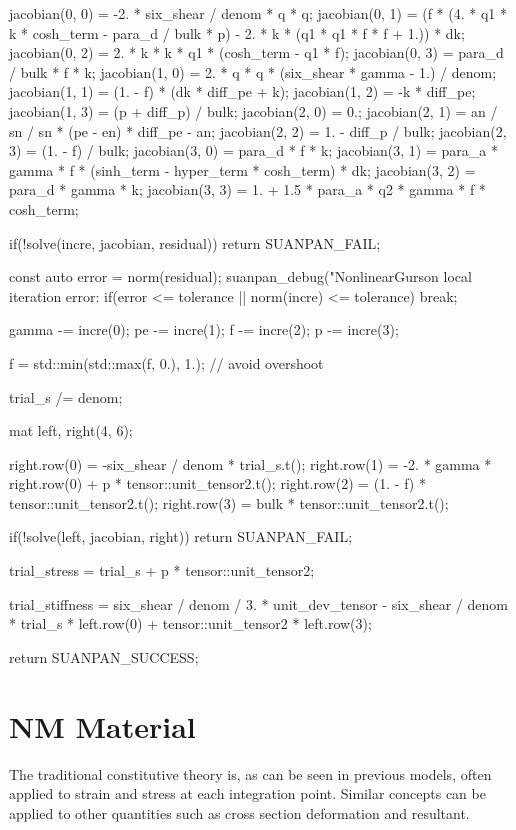 \begin{cppcode}
{{        jacobian(0, 0) = -2. * six_shear / denom * q * q;
        jacobian(0, 1) = (f * (4. * q1 * k * cosh_term - para_d / bulk * p) - 2. * k * (q1 * q1 * f * f + 1.)) * dk;
        jacobian(0, 2) = 2. * k * k * q1 * (cosh_term - q1 * f);
        jacobian(0, 3) = para_d / bulk * f * k;
        jacobian(1, 0) = 2. * q * q * (six_shear * gamma - 1.) / denom;
        jacobian(1, 1) = (1. - f) * (dk * diff_pe + k);
        jacobian(1, 2) = -k * diff_pe;
        jacobian(1, 3) = (p + diff_p) / bulk;
        jacobian(2, 0) = 0.;
        jacobian(2, 1) = an / sn / sn * (pe - en) * diff_pe - an;
        jacobian(2, 2) = 1. - diff_p / bulk;
        jacobian(2, 3) = (1. - f) / bulk;
        jacobian(3, 0) = para_d * f * k;
        jacobian(3, 1) = para_a * gamma * f * (sinh_term - hyper_term * cosh_term) * dk;
        jacobian(3, 2) = para_d * gamma * k;
        jacobian(3, 3) = 1. + 1.5 * para_a * q2 * gamma * f * cosh_term;

        if(!solve(incre, jacobian, residual)) return SUANPAN_FAIL;

        const auto error = norm(residual);
        suanpan_debug("NonlinearGurson local iteration error: %
        if(error <= tolerance || norm(incre) <= tolerance) break;

        gamma -= incre(0);
        pe -= incre(1);
        f -= incre(2);
        p -= incre(3);

        f = std::min(std::max(f, 0.), 1.); // avoid overshoot
    }

    trial_s /= denom;

    mat left, right(4, 6);

    right.row(0) = -six_shear / denom * trial_s.t();
    right.row(1) = -2. * gamma * right.row(0) + p * tensor::unit_tensor2.t();
    right.row(2) = (1. - f) * tensor::unit_tensor2.t();
    right.row(3) = bulk * tensor::unit_tensor2.t();

    if(!solve(left, jacobian, right)) return SUANPAN_FAIL;

    trial_stress = trial_s + p * tensor::unit_tensor2;

    trial_stiffness = six_shear / denom / 3. * unit_dev_tensor - six_shear / denom * trial_s * left.row(0) + tensor::unit_tensor2 * left.row(3);

    return SUANPAN_SUCCESS;
}
\end{cppcode}
\section{NM Material}
The traditional constitutive theory is, as can be seen in previous models, often applied to strain and stress at each integration point. Similar concepts can be applied to other quantities such as cross section deformation and resultant.

